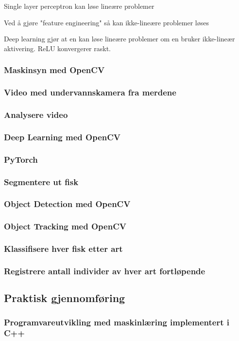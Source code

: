 Single layer perceptron kan løse lineære problemer

Ved å gjøre "feature engineering" så kan ikke-lineære problemer løses

Deep learning gjør at en kan løse lineære problemer om en bruker ikke-lineær aktivering. ReLU konvergerer raskt.

\subsubsection{Maskinsyn med OpenCV}
\subsubsection{Video med undervannskamera fra merdene}
\subsubsection{Analysere video}
\subsubsection{Deep Learning med OpenCV}
\subsubsection{PyTorch}
\subsubsection{Segmentere ut fisk}
\subsubsection{Object Detection med OpenCV}
\subsubsection{Object Tracking med OpenCV}
\subsubsection{Klassifisere hver fisk etter art}
\subsubsection{Registrere antall individer av hver art fortløpende}
\subsection{Praktisk gjennomføring}
\subsubsection{Programvareutvikling med maskinlæring implementert i C++}
